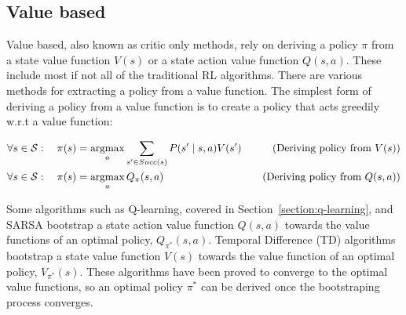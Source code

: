 \documentclass{../main.tex}{}
\begin{document}
% 

\subsection{Value based}
Value based, also known as critic only methods, rely on deriving a policy $\pi$ from a state value function $V(s)$ or a state action value function $Q(s,a)$. These include most if not all of the traditional RL algorithms. There are various methods for extracting a policy from a value function. The simplest form of deriving a policy from a value function is to create a policy that acts greedily w.r.t a value function:

\begin{equation}
    \label{equation:policy-extraction}
\begin{aligned}
    \forall s \in \mathcal{S}: \quad \pi(s) &= \operatorname*{argmax}_{a} \sum_{s' \in Succ(s)} P(s' \mid s, a) V(s') \quad & (\text{Deriving policy from } V(s)) \\
    \forall s \in \mathcal{S}: \quad \pi(s) &= \operatorname*{argmax}_{a} Q_{\pi}(s,a) \quad & (\text{Deriving policy from } Q(s,a))
\end{aligned}
\end{equation}

Some algorithms such as Q-learning, covered in Section~\ref{section:q-learning}, and SARSA bootstrap a state action value function $Q(s,a)$ towards the value functions of an optimal policy, $Q_{\pi^*}(s,a)$. Temporal Difference (TD) algorithms bootstrap a state value function $V(s)$ towards the value function of an optimal policy, $V_{\pi^*}(s)$. These algorithms have been proved to converge to the optimal value functions, so an optimal policy $\pi^*$ can be derived once the bootstraping process converges.
\end{document}
